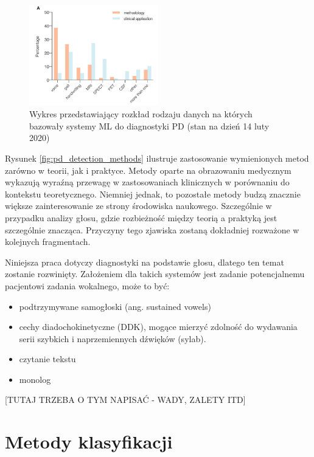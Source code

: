 \begin{figure}[htbp]
	\centering
	\includegraphics[width=0.5\textwidth]{./img/plot_PD_detection_methods}
	\caption{Wykres przedstawiający rozkład rodzaju danych na których bazowały systemy ML do diagnostyki PD (stan na dzień 14 luty 2020) \cite{ML_for_PD_review} }
    \label{fig:pd_detection_methods}\label{fig:figure}
\end{figure}

Rysunek \ref{fig:pd_detection_methods} ilustruje zastosowanie wymienionych metod zarówno w teorii, jak i praktyce.
Metody oparte na obrazowaniu medycznym wykazują wyraźną przewagę w zastosowaniach klinicznych w porównaniu do kontekstu teoretycznego.
Niemniej jednak, to pozostałe metody budzą znacznie większe zainteresowanie ze strony środowiska naukowego.
Szczególnie w przypadku analizy głosu, gdzie rozbieżność między teorią a praktyką jest szczególnie znacząca.
Przyczyny tego zjawiska zostaną dokładniej rozważone w kolejnych fragmentach.

Niniejsza praca dotyczy diagnostyki na podstawie głosu, dlatego ten temat zostanie rozwinięty.
Założeniem dla takich systemów jest zadanie potencjalnemu pacjentowi zadania wokalnego, może to być:
\begin{itemize}[itemsep=0.1pt]
	\item podtrzymywane samogłoski (ang. sustained vowels)
	\item cechy diadochokinetyczne (DDK), mogące mierzyć zdolność do wydawania serii szybkich i naprzemiennych dźwięków (sylab).
	\item czytanie tekstu
	\item monolog
\end{itemize}

[TUTAJ TRZEBA O TYM NAPISAĆ - WADY, ZALETY ITD]


\section{Metody klasyfikacji}\label{sec:metody-klasyfikacji}

